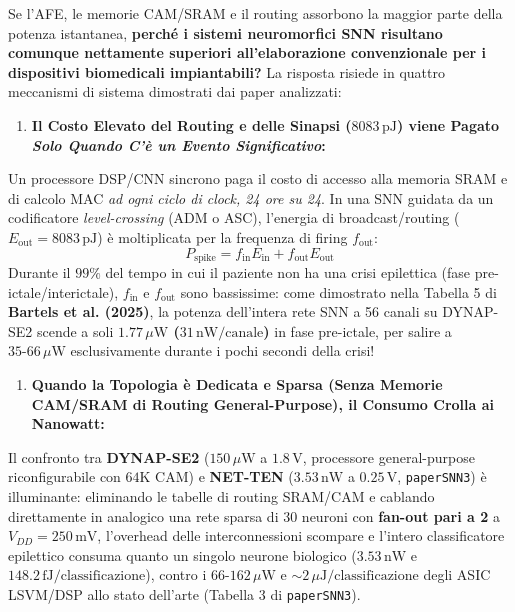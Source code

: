 \documentclass[11pt,a4paper]{article}
\begin{document}
Se l'AFE, le memorie CAM/SRAM e il routing assorbono la maggior parte della potenza istantanea, \textbf{perché i sistemi neuromorfici SNN risultano comunque nettamente superiori all'elaborazione convenzionale per i dispositivi biomedicali impiantabili?} La risposta risiede in quattro meccanismi di sistema dimostrati dai paper analizzati:

\begin{enumerate}
  \item \textbf{Il Costo Elevato del Routing e delle Sinapsi ($8083\,\text{pJ}$) viene Pagato \textit{Solo Quando C'è un Evento Significativo}:}
\end{enumerate}
Un processore DSP/CNN sincrono paga il costo di accesso alla memoria SRAM e di calcolo MAC \textit{ad ogni ciclo di clock, 24 ore su 24}. In una SNN guidata da un codificatore \textit{level-crossing} (ADM o ASC), l'energia di broadcast/routing ($E_{\text{out}} = 8083\,\text{pJ}$) è moltiplicata per la frequenza di firing $f_{\text{out}}$:
\[
P_{\text{spike}} = f_{\text{in}} E_{\text{in}} + f_{\text{out}} E_{\text{out}}
\]
Durante il $99\%$ del tempo in cui il paziente non ha una crisi epilettica (fase pre-ictale/interictale), $f_{\text{in}}$ e $f_{\text{out}}$ sono bassissime: come dimostrato nella Tabella 5 di \textbf{Bartels et al. (2025)}, la potenza dell'intera rete SNN a 56 canali su DYNAP-SE2 scende a soli \textbf{$1.77\,\mu\text{W}$ ($31\,\text{nW/canale}$)} in fase pre-ictale, per salire a $35\text{-}66\,\mu\text{W}$ esclusivamente durante i pochi secondi della crisi!
\begin{enumerate}
  \item \textbf{Quando la Topologia è Dedicata e Sparsa (Senza Memorie CAM/SRAM di Routing General-Purpose), il Consumo Crolla ai Nanowatt:}
\end{enumerate}
Il confronto tra \textbf{DYNAP-SE2} ($150\,\mu\text{W}$ a $1.8\,\text{V}$, processore general-purpose riconfigurabile con $64\text{K}$ CAM) e \textbf{NET-TEN} (\textbf{$3.53\,\text{nW}$} a $0.25\,\text{V}$, \texttt{paperSNN3}) è illuminante: eliminando le tabelle di routing SRAM/CAM e cablando direttamente in analogico una rete sparsa di 30 neuroni con \textbf{fan-out pari a 2} a $V_{DD} = 250\,\text{mV}$, l'overhead delle interconnessioni scompare e l'intero classificatore epilettico consuma quanto un singolo neurone biologico ($3.53\,\text{nW}$ e $148.2\,\text{fJ/classificazione}$), contro i $66\text{-}162\,\mu\text{W}$ e $\sim 2\,\mu\text{J/classificazione}$ degli ASIC LSVM/DSP allo stato dell'arte (Tabella 3 di \texttt{paperSNN3}).
\end{document}

